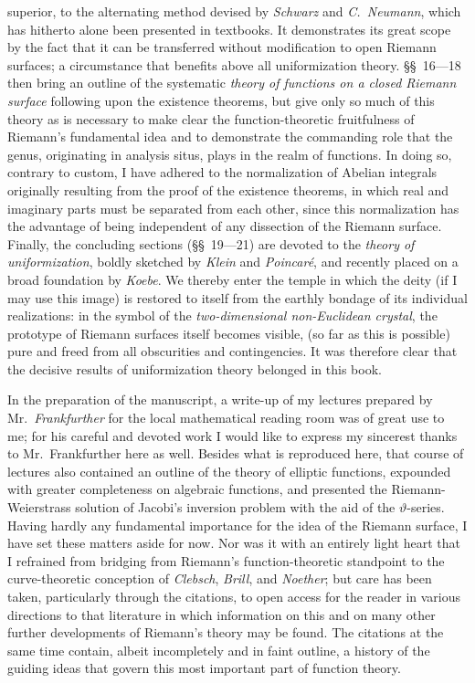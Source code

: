 \documentclass{article}
\begin{document}
superior, to the alternating method devised by \emph{Schwarz} and \emph{C.~Neumann}, which has hitherto alone been presented in textbooks. It demonstrates its great scope by the fact that it can be transferred without modification to open Riemann surfaces; a circumstance that benefits above all uniformization theory. §§~16---18 then bring an outline of the systematic \emph{theory of functions on a closed Riemann surface} following upon the existence theorems, but give only so much of this theory as is necessary to make clear the function-theoretic fruitfulness of Riemann's fundamental idea and to demonstrate the commanding role that the genus, originating in analysis situs, plays in the realm of functions. In doing so, contrary to custom, I have adhered to the normalization of Abelian integrals originally resulting from the proof of the existence theorems, in which real and imaginary parts must be separated from each other, since this normalization has the advantage of being independent of any dissection of the Riemann surface. Finally, the concluding sections (§§~19---21) are devoted to the \emph{theory of uniformization}, boldly sketched by \emph{Klein} and \emph{Poincaré}, and recently placed on a broad foundation by \emph{Koebe}. We thereby enter the temple in which the deity (if I may use this image) is restored to itself from the earthly bondage of its individual realizations: in the symbol of the \emph{two-dimensional non-Euclidean crystal}, the prototype of Riemann surfaces itself becomes visible, (so far as this is possible) pure and freed from all obscurities and contingencies. It was therefore clear that the decisive results of uniformization theory belonged in this book.

In the preparation of the manuscript, a write-up of my lectures prepared by Mr.~\emph{Frankfurther} for the local mathematical reading room was of great use to me; for his careful and devoted work I would like to express my sincerest thanks to Mr.~Frankfurther here as well. Besides what is reproduced here, that course of lectures also contained an outline of the theory of elliptic functions, expounded with greater completeness on algebraic functions, and presented the Riemann-Weierstrass solution of Jacobi's inversion problem with the aid of the $\vartheta$-series. Having hardly any fundamental importance for the idea of the Riemann surface, I have set these matters aside for now. Nor was it with an entirely light heart that I refrained from bridging from Riemann's function-theoretic standpoint to the curve-theoretic conception of \emph{Clebsch}, \emph{Brill}, and \emph{Noether}; but care has been taken, particularly through the citations, to open access for the reader in various directions to that literature in which information on this and on many other further developments of Riemann's theory may be found. The citations at the same time contain, albeit incompletely and in faint outline, a history of the guiding ideas that govern this most important part of function theory.
\end{document}
